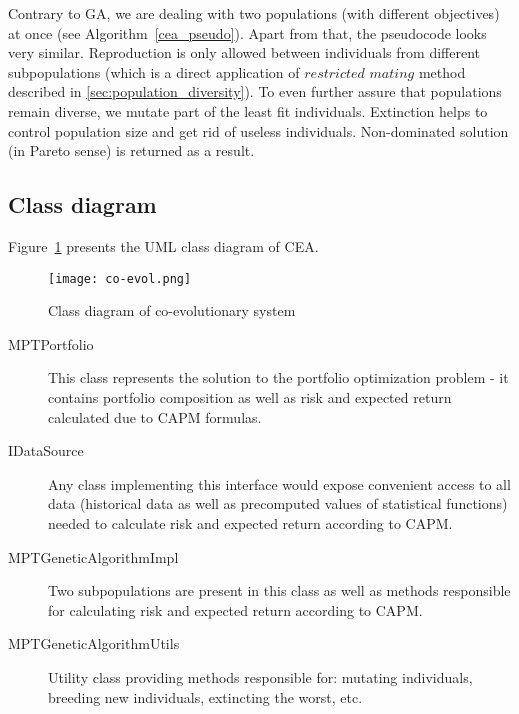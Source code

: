 Contrary to GA, we are dealing with two populations (with different objectives) at once (see Algorithm~\ref{cea_pseudo}).
Apart from that, the pseudocode looks very similar.
Reproduction is only allowed between individuals from different subpopulations (which is a direct application of $restricted$ $mating$ method
 described in \ref{sec:population_diversity}).
To even further assure that populations remain diverse, we mutate part of the least fit individuals.
Extinction helps to control population size and get rid of useless individuals.
Non-dominated solution (in Pareto sense) is returned as a result.

\subsection{Class diagram}
\label{Co-evol-class-diagram}

Figure~\ref{fig:GA_UML} presents the UML class diagram of CEA.

\begin{figure}[ht]   
	    \begin{center}
	      \texttt{[image: co-evol.png]}
	    \end{center}
	    \caption{Class diagram of co-evolutionary system} 
	    \label{fig:GA_UML}
	  \end{figure}

\begin{description}
    \item [MPTPortfolio]
	This class represents the solution to the portfolio optimization problem - it contains portfolio composition as well as risk and expected return calculated
	due to CAPM formulas.
    \item [IDataSource]
	Any class implementing this interface would expose convenient access to all data (historical data as well as precomputed values of statistical functions)
	needed to calculate risk and expected return according to CAPM.
    \item [MPTGeneticAlgorithmImpl]
	Two subpopulations are present in this class as well as methods responsible for calculating risk and expected return according to CAPM. 
	    
    \item [MPTGeneticAlgorithmUtils]
	Utility class providing methods responsible for: mutating individuals, breeding new individuals, extincting the worst, etc. 
    
\end{description}




